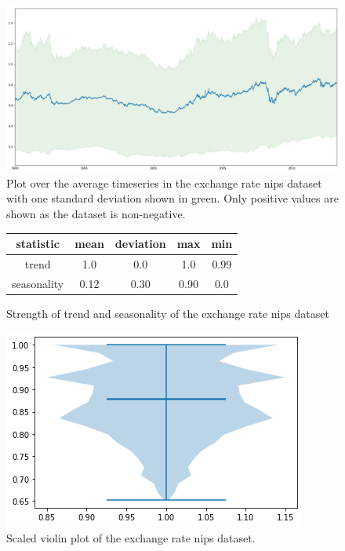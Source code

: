 \begin{figure}[htb]
    \centering
    \includegraphics[width=\linewidth]{./img/exchange_rate_nips_plot.png}
    \caption{Plot over the average timeseries in the exchange rate nips dataset with one standard deviation shown in green. Only positive values are shown as the dataset is non-negative.}
    \label{fig:exchange_rate_nips_plot}
    \endminipage\hfill
\end{figure}

\begin{figure}[htb]
    \centering
    \begin{center}
        \begin{tabular}{||c | c | c | c | c |}
            \hline
            statistic   & mean & deviation & max  & min  \\
            \hline
            trend       & 1.0  & 0.0       & 1.0  & 0.99 \\
            \hline
            seasonality & 0.12 & 0.30      & 0.90 & 0.0  \\
            \hline
            \hline
        \end{tabular}
        \caption{Strength of trend and seasonality of the exchange rate nips dataset}
    \end{center}
    \endminipage\hfill
    \includegraphics[width=\linewidth]{./img/exchange_rate_nips_violin.png}
    \caption{Scaled violin plot of the exchange rate nips dataset.}
    \label{fig:exchange_rate_nips_violin}
    \endminipage\hfill
\end{figure}

